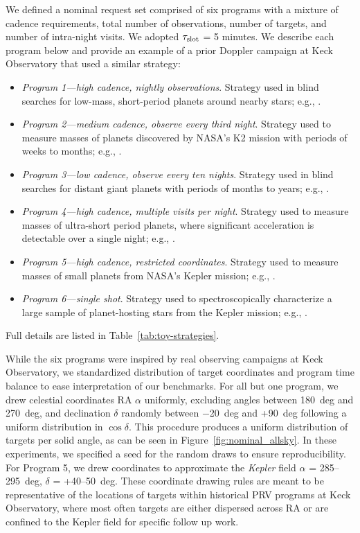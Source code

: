 \documentclass[twocolumn,linenumbers]{aastex63}
\def\slot{\mathrm{slot}}
\newcommand{\isr}[2]{\ensuremath{#1_{\rm #2}}\xspace}
\begin{document}
We defined a nominal request set comprised of six programs with a mixture of cadence requirements, total number of observations, number of targets, and number of intra-night visits. We adopted \isr{\tau}{\slot} = 5 minutes. We describe each program below and provide an example of a prior Doppler campaign at Keck Observatory that used a similar strategy:
%
\begin{itemize}
\item {\em Program 1---high cadence, nightly observations}. Strategy used in blind searches for low-mass, short-period planets around nearby stars; e.g., \cite{Howard2010}.

\item {\em Program 2---medium cadence, observe every third night}. Strategy used to measure masses of planets discovered by NASA's K2 mission with periods of weeks to months; e.g., \cite{Sinukoff2018}.

\item {\em Program 3---low cadence, observe every ten nights}. Strategy used in blind searches for distant giant planets with periods of months to years; e.g., \citealt{VanZandt2025}.

\item {\em Program 4---high cadence, multiple visits per night}. Strategy used to measure masses of ultra-short period planets, where significant acceleration is detectable over a single night; e.g., \cite{Dai2024}. 

\item {\em Program 5---high cadence, restricted coordinates}. Strategy used to measure masses of small planets from NASA's Kepler mission; e.g., \cite{Marcy2014}.

\item {\em Program 6---single shot}. Strategy used to spectroscopically characterize a large sample of planet-hosting stars from the Kepler mission; e.g., \cite{Petigura2017}.
\end{itemize}
%
Full details are listed in Table~\ref{tab:toy-strategies}.

While the six programs were inspired by real observing campaigns at Keck Observatory, we standardized distribution of target coordinates and program time balance to ease interpretation of our benchmarks. For all but one program, we drew celestial coordinates RA $\alpha$ uniformly, excluding angles between 180~deg and 270~deg, and declination $\delta$ randomly between $-$20~deg and +90~deg following a uniform distribution in $\cos \delta$. This procedure produces a uniform distribution of targets per solid angle, as can be seen in Figure~\ref{fig:nominal_allsky}. In these experiments, we specified a seed for the random draws to ensure reproducibility. For Program 5, we drew coordinates to approximate the {\em Kepler} field $\alpha$ = 285--295~deg, $\delta$ = +40--50~deg. These coordinate drawing rules are meant to be representative of the locations of targets within historical PRV programs at Keck Observatory, where most often targets are either dispersed across RA or are confined to the Kepler field for specific follow up work.
\end{document}

